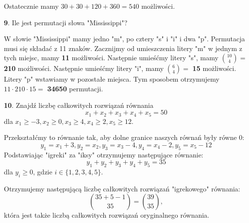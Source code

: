 \documentclass{article}
\begin{document}
Ostatecznie mamy $30+30+120+360=540$ możliwości.

\begin{flushleft}
\large \textbf{9}. Ile jest permutacji słowa "Mississippi"?
\end{flushleft}

W słowie "Mississippi" mamy jedno "m", po cztery "s" i "i" i dwa "p". Permutacja musi się składać z 11 znaków. Zacznijmy od umieszczenia litery "m" w jednym z tych miejsc, mamy \textbf{11} możliwości. Następnie umieśćmy litery "s", mamy ${10\choose4}=$ \textbf{210} możliwości. Następnie umieśćmy litery "i", mamy ${6\choose4}=$ \textbf{15} możliwości. Litery "p" wstawiamy w pozostałe miejsca. Tym sposobem otrzymujemy $11\cdot210\cdot15=$ \textbf{34650} permutacji.

\begin{flushleft}
\large \textbf{10}. Znajdź liczbę całkowitych rozwiązań równania 
$$x_1+x_2+x_3+x_4+x_5=50$$
dla $x_1\geq -3,x_2\geq0,x_3\geq4,x_4\geq2,x_5\geq12$.
\end{flushleft}
Przekształćmy to równanie tak, aby dolne granice naszych równań były równe 0:
$$y_1=x_1+3,y_2=x_2,y_3=x_3-4,y_4=x_4-2,y_5=x_5-12$$
Podstawiając "igreki" za "iksy" otrzymujemy następujące równanie:
$$y_1+y_2+y_3+y_4+y_5=35$$
dla $y_i\geq0$, gdzie $i\in \{1,2,3,4,5\}$.

Otrzymujemy następującą liczbę całkowitych rozwiązań "igrekowego" równania: 
$${35+5-1\choose35}={39\choose35},$$
która jest także liczbą całkowitych rozwiązań oryginalnego równania.
\end{document}
